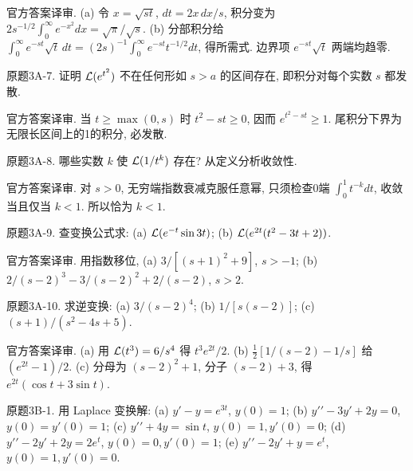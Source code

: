 \begin{solution}
官方答案译审. (a) 令 $x=\sqrt{st}$, $dt=2x\,dx/s$, 积分变为 $2s^{-1/2}\int_0^\infty e^{-x^2}dx=\sqrt\pi/\sqrt s$. (b) 分部积分给 $\int_0^\infty e^{-st}\sqrt t\,dt=(2s)^{-1}\int_0^\infty e^{-st}t^{-1/2}dt$, 得所需式. 边界项 $e^{-st}\sqrt t$ 两端均趋零.
\end{solution}
\begin{exercise}\label{cw:bank-3A-7}
原题3A-7. 证明 $\mathcal L(e^{t^2})$ 不在任何形如 $s>a$ 的区间存在, 即积分对每个实数 $s$ 都发散.
\end{exercise}
\begin{solution}
官方答案译审. 当 $t\ge\max(0,s)$ 时 $t^2-st\ge0$, 因而 $e^{t^2-st}\ge1$. 尾积分下界为无限长区间上的1的积分, 必发散.
\end{solution}
\begin{exercise}\label{cw:bank-3A-8}
原题3A-8. 哪些实数 $k$ 使 $\mathcal L(1/t^k)$ 存在? 从定义分析收敛性.
\end{exercise}
\begin{solution}
官方答案译审. 对 $s>0$, 无穷端指数衰减克服任意幂, 只须检查0端 $\int_0^1t^{-k}dt$, 收敛当且仅当 $k<1$. 所以恰为 $k<1$.
\end{solution}
\begin{exercise}\label{cw:bank-3A-9}
原题3A-9. 查变换公式求: (a) $\mathcal L(e^{-t}\sin3t)$; (b) $\mathcal L(e^{2t}(t^2-3t+2))$.
\end{exercise}
\begin{solution}
官方答案译审. 用指数移位, (a) $3/[(s+1)^2+9]$, $s>-1$; (b) $2/(s-2)^3-3/(s-2)^2+2/(s-2)$, $s>2$.
\end{solution}
\begin{exercise}\label{cw:bank-3A-10}
原题3A-10. 求逆变换: (a) $3/(s-2)^4$; (b) $1/[s(s-2)]$; (c) $(s+1)/(s^2-4s+5)$.
\end{exercise}
\begin{solution}
官方答案译审. (a) 用 $\mathcal L(t^3)=6/s^4$ 得 $t^3e^{2t}/2$. (b) $\frac12[1/(s-2)-1/s]$ 给 $(e^{2t}-1)/2$. (c) 分母为 $(s-2)^2+1$, 分子 $(s-2)+3$, 得 $e^{2t}(\cos t+3\sin t)$.
\end{solution}
\begin{exercise}\label{cw:bank-3B-1}
原题3B-1. 用 Laplace 变换解: (a) $y\prime-y=e^{3t}$, $y(0)=1$; (b) $y\prime\prime-3y\prime+2y=0$, $y(0)=y\prime(0)=1$; (c) $y\prime\prime+4y=\sin t$, $y(0)=1,y\prime(0)=0$; (d) $y\prime\prime-2y\prime+2y=2e^t$, $y(0)=0,y\prime(0)=1$; (e) $y\prime\prime-2y\prime+y=e^t$, $y(0)=1,y\prime(0)=0$.
\end{exercise}
